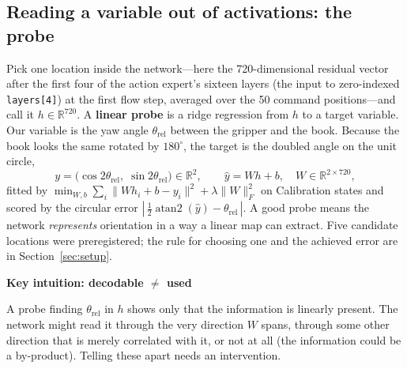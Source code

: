 \documentclass[11pt,a4paper]{article}
\newenvironment{claimbox}[1]{\par\medskip\noindent\setlength{\fboxsep}{6pt}\setlength{\fboxrule}{0.5pt}\begin{lrbox}{\claimsavebox}\begin{minipage}{\dimexpr\linewidth-2\fboxsep-2\fboxrule\relax}\setlength{\parskip}{2pt}\textbf{#1}\par\smallskip}{\end{minipage}\end{lrbox}\fcolorbox{black!45}{claimbg}{\usebox{\claimsavebox}}\par\medskip}
\begin{document}
\subsection{Reading a variable out of activations: the probe}
\label{sec:probe}
Pick one location inside the network---here the 720-dimensional residual vector after the first four of the action expert's sixteen layers (the input to zero-indexed \texttt{layers[4]}) at the first flow step, averaged over the 50 command positions---and call it $h \in \mathbb{R}^{720}$. A \textbf{linear probe} is a ridge regression from $h$ to a target variable. Our variable is the yaw angle $\theta_{\mathrm{rel}}$ between the gripper and the book. Because the book looks the same rotated by $180^\circ$, the target is the doubled angle on the unit circle,
\[
y = \big(\cos 2\theta_{\mathrm{rel}},\; \sin 2\theta_{\mathrm{rel}}\big) \in \mathbb{R}^2, \qquad
\hat y = W h + b,\quad W \in \mathbb{R}^{2\times 720},
\]
fitted by $\min_{W,b} \sum_i \|W h_i + b - y_i\|^2 + \lambda \|W\|_F^2$ on Calibration states and scored by the circular error $|\,\tfrac12\operatorname{atan2}(\hat y) - \theta_{\mathrm{rel}}\,|$. A good probe means the network \emph{represents} orientation in a way a linear map can extract. Five candidate locations were preregistered; the rule for choosing one and the achieved error are in Section~\ref{sec:setup}.

\begin{claimbox}{Key intuition: decodable $\neq$ used}
A probe finding $\theta_{\mathrm{rel}}$ in $h$ shows only that the information is linearly present. The network might read it through the very direction $W$ spans, through some other direction that is merely correlated with it, or not at all (the information could be a by-product). Telling these apart needs an intervention.
\end{claimbox}
\end{document}
